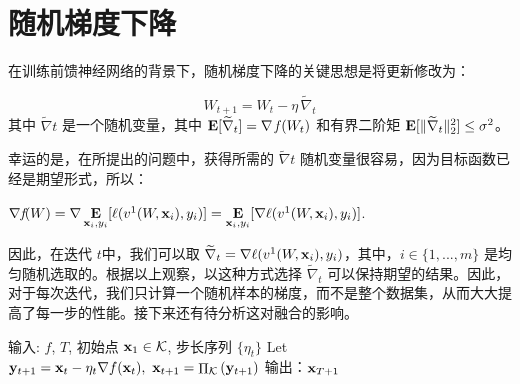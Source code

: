 \section{
    随机梯度下降
    }

在训练前馈神经网络的背景下，随机梯度下降的关键思想是将更新修改为：

\begin{equation}
W_{t+1} = W_t - \eta \, \widetilde{\nabla}_t
\end{equation}
其中 $\widetilde{\nabla}t$ 是一个随机变量，其中  $\mathop{\mbox{\bf E}}[\widetilde{\nabla}_t] = \nabla \, \textit{f} \, (W_t)$ 和有界二阶矩 $\mathop{\mbox{\bf E}}[\|\widetilde{\nabla}_t\|_2^2] \leq \sigma^2$。

幸运的是，在所提出的问题中，获得所需的 $\widetilde{\nabla}t$ 随机变量很容易，因为目标函数已经是期望形式，所以：
\begin{center}
$\nabla \textit{f}(W) = \nabla \mathop{\mbox{\bf E}}\limits_{\mathbf x_i, y_i} [\ell(v^1(W, \mathbf x_i), y_i)] = \mathop{\mbox{\bf E}}\limits_{\mathbf x_i, y_i} [\nabla \ell(v^1(W, \mathbf x_i), y_i)]$.
\end{center}

因此，在迭代 $t$中，我们可以取 $\widetilde{\nabla}_t = \nabla \ell(v^1(W, \mathbf x_i), y_i)$，其中，$i \in \{1,..., m\}$ 是均匀随机选取的。根据以上观察，以这种方式选择 $\widetilde{\nabla}_t $ 可以保持期望的结果。因此，对于每次迭代，我们只计算一个随机样本的梯度，而不是整个数据集，从而大大提高了每一步的性能。接下来还有待分析这对融合的影响。
\begin{algorithm}[h!]
\caption{
    随机梯度下降
    }
\label{alg:BasicSGD}
\begin{algorithmic}[1]
\STATE %
输入: $f$, $T$, 初始点 $\mathbf x_1 \in \mathcal K$, 步长序列 $\{\eta_t\}$
\STATE Let $ \mathbf y_{t+1} = \mathbf x_{t}-\eta_t {\nabla f}(\mathbf x_t) , \  \mathbf x_{t+1}= \mathop{\Pi}_{\mathcal K} \left( \mathbf y_{t+1}  \right) $
\ENDFOR
\STATE 输出：${\mathbf x}_{T+1} $ 
\end{algorithmic}
\end{algorithm}



